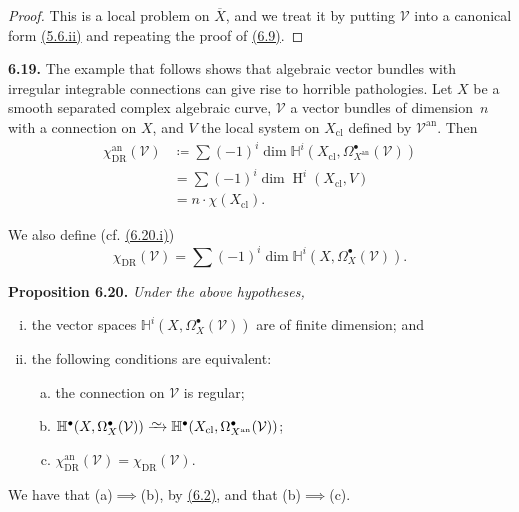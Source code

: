 \documentclass{report}
\newenvironment{itenv}[1]
  {\phantomsection\par\medskip\noindent\textbf{#1.}\itshape}
  {\par\medskip}
\newenvironment{rmenv}[1]
  {\phantomsection\par\medskip\noindent\textbf{#1.}\rmfamily}
  {\par\medskip}
\renewcommand{\cal}[1]{{\mathcal{#1}}}
\newcommand{\an}{\mathrm{an}}
\newcommand{\cl}{\mathrm{cl}}
\newcommand{\simto}{\xrightarrow{\raisebox{-0.7ex}[0ex][0ex]{$\sim$}}}
\DeclareMathOperator{\HH}{H}
\begin{document}
\begin{proof}
  This is a local problem on $\overline{X}$, and we treat it by putting $\cal{V}$ into a canonical form \hyperref[II.5.6]{(5.6.ii)} and repeating the proof of \hyperref[II.6.9]{(6.9)}.
\end{proof}

\begin{rmenv}{6.19}
\label{II.6.19}
  The example that follows shows that algebraic vector bundles with irregular integrable connections can give rise to horrible pathologies.
  Let $X$ be a smooth separated complex algebraic curve, $\cal{V}$ a vector bundles of dimension~$n$ with a connection on $X$, and $V$ the local system on $X_\cl$ defined by $\cal{V}^\an$.
  Then
  \[
    \begin{aligned}
      \chi_\mathrm{DR}^\an(\cal{V})
      &\coloneqq \sum (-1)^i \dim\mathbb{H}^i\left(X_\cl,\Omega_{X^\an}^\bullet(\cal{V})\right)
    \\&= \sum (-1)^i \dim\HH^i(X_\cl,V)
    \\&= n\cdot\chi(X_\cl).
    \end{aligned}
  \]

  We also define (cf. \hyperref[II.6.20]{(6.20.i)})
  \[
    \chi_\mathrm{DR}(\cal{V})
    = \sum (-1)^i \dim\mathbb{H}^i\left(X,\Omega_X^\bullet(\cal{V})\right).
  \]
\end{rmenv}

\begin{itenv}{Proposition 6.20}
\label{II.6.20}
  Under the above hypotheses,
  \begin{enumerate}[(i)]
    \item the vector spaces $\mathbb{H}^i(X,\Omega_X^\bullet(\cal{V}))$ are of finite dimension; and
    \item the following conditions are equivalent:
      \begin{enumerate}[(a)]
        \item the connection on $\cal{V}$ is regular;
        \item $\mathbb{H}^\bullet(X,\Omega_X^\bullet(\cal{V}))\simto\mathbb{H}^\bullet(X_\cl,\Omega_{X^\an}^\bullet(\cal{V}))$;
        \item $\chi_\mathrm{DR}^\an(\cal{V})=\chi_\mathrm{DR}(\cal{V})$.
      \end{enumerate}
  \end{enumerate}
\end{itenv}

We have that (a)$\implies$(b), by \hyperref[II.6.2]{(6.2)}, and that (b)$\implies$(c).
\end{document}
